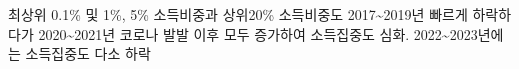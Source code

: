 \documentclass[
  a4paper,
  oneside,
  open=any]{scrbook}
\begin{document}
\begin{figure}
\begin{minipage}{0.33\linewidth}


\end{minipage}%

\end{figure}%

최상위 0.1\% 및 1\%, 5\% 소득비중과 상위20\% 소득비중도
2017\textasciitilde2019년 빠르게 하락하다가 2020\textasciitilde2021년
코로나 발발 이후 모두 증가하여 소득집중도 심화.
2022\textasciitilde2023년에는 소득집중도 다소 하락
\end{document}
